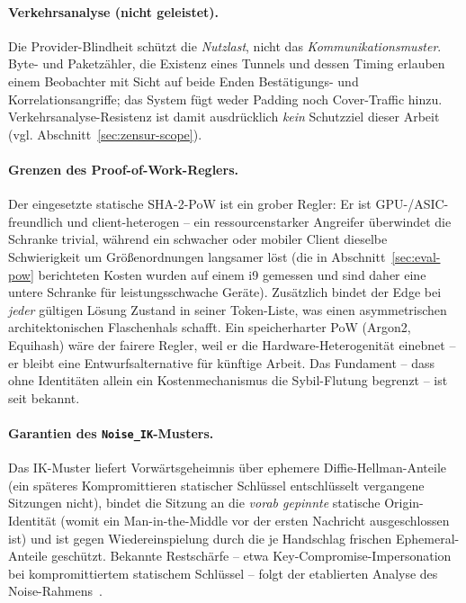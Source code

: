 \paragraph{Verkehrsanalyse (nicht geleistet).} Die Provider-Blindheit schützt die
\emph{Nutzlast}, nicht das \emph{Kommunikationsmuster}. Byte- und Paketzähler, die
Existenz eines Tunnels und dessen Timing erlauben einem Beobachter mit Sicht auf
beide Enden Bestätigungs- und Korrelationsangriffe; das System fügt weder Padding
noch Cover-Traffic hinzu. Verkehrsanalyse-Resistenz ist damit ausdrücklich
\emph{kein} Schutzziel dieser Arbeit (vgl. Abschnitt~\ref{sec:zensur-scope}).

\paragraph{Grenzen des Proof-of-Work-Reglers.} Der eingesetzte statische
SHA-2-PoW ist ein grober Regler: Er ist GPU-/ASIC-freundlich und
client-heterogen -- ein ressourcenstarker Angreifer überwindet die Schranke
trivial, während ein schwacher oder mobiler Client dieselbe Schwierigkeit um
Größenordnungen langsamer löst (die in Abschnitt~\ref{sec:eval-pow} berichteten
Kosten wurden auf einem i9 gemessen und sind daher eine untere Schranke für
leistungsschwache Geräte). Zusätzlich bindet der Edge bei \emph{jeder} gültigen
Lösung Zustand in seiner Token-Liste, was einen asymmetrischen architektonischen
Flaschenhals schafft. Ein speicherharter PoW (Argon2, Equihash) wäre der fairere
Regler, weil er die Hardware-Heterogenität einebnet -- er bleibt eine
Entwurfsalternative für künftige Arbeit. Das Fundament -- dass ohne Identitäten
allein ein Kostenmechanismus die Sybil-Flutung begrenzt -- ist seit
\cite{douceur2002sybil} bekannt.

\paragraph{Garantien des \texttt{Noise\_IK}-Musters.} Das IK-Muster liefert
Vorwärtsgeheimnis über ephemere Diffie-Hellman-Anteile (ein späteres
Kompromittieren statischer Schlüssel entschlüsselt vergangene Sitzungen nicht),
bindet die Sitzung an die \emph{vorab gepinnte} statische Origin-Identität (womit
ein Man-in-the-Middle vor der ersten Nachricht ausgeschlossen ist) und ist gegen
Wiedereinspielung durch die je Handschlag frischen Ephemeral-Anteile geschützt.
Bekannte Restschärfe -- etwa Key-Compromise-Impersonation bei kompromittiertem
statischem Schlüssel -- folgt der etablierten Analyse des
Noise-Rahmens~\cite{noiseprotocol}.


